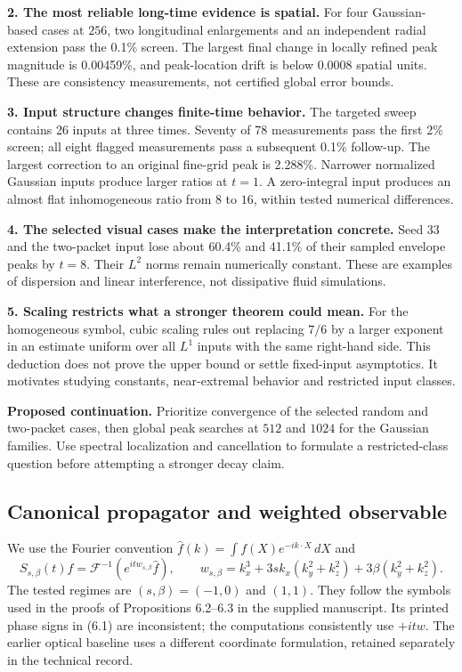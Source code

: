 \documentclass[10pt,letterpaper]{article}
\numberwithin{equation}{section}
\newcommand{\callout}[1]{\par\medskip\noindent #1\par\medskip}
\begin{document}
\textbf{2. The most reliable long-time evidence is spatial.} For four
Gaussian-based cases at $256$, two longitudinal enlargements and an independent
radial extension pass the 0.1\% screen. The largest final change in locally
refined peak magnitude is 0.00459\%, and peak-location drift is below 0.0008
spatial units. These are consistency measurements, not certified global error bounds.

\textbf{3. Input structure changes finite-time behavior.} The targeted sweep
contains 26 inputs at three times. Seventy of 78 measurements pass the first 2\%
screen; all eight flagged measurements pass a subsequent 0.1\% follow-up. The
largest correction to an original fine-grid peak is 2.288\%. Narrower normalized
Gaussian inputs produce larger ratios at $t=1$. A zero-integral input produces an
almost flat inhomogeneous ratio from $8$ to $16$, within tested numerical differences.

\textbf{4. The selected visual cases make the interpretation concrete.} Seed 33
and the two-packet input lose about 60.4\% and 41.1\% of their sampled envelope
peaks by $t=8$. Their $L^2$ norms remain numerically constant. These are examples
of dispersion and linear interference, not dissipative fluid simulations.

\textbf{5. Scaling restricts what a stronger theorem could mean.} For the
homogeneous symbol, cubic scaling rules out replacing $7/6$ by a larger exponent
in an estimate uniform over all $L^1$ inputs with the same right-hand side.
This deduction does not prove the upper bound or settle fixed-input asymptotics.
It motivates studying constants, near-extremal behavior and restricted input classes.
\callout{\textbf{Proposed continuation.} Prioritize convergence of
the selected random and two-packet cases, then global peak searches at $512$ and
$1024$ for the Gaussian families. Use spectral localization and cancellation to
formulate a restricted-class question before attempting a stronger decay claim.}

\subsection{Canonical propagator and weighted observable}\label{target}
We use the Fourier convention $\widehat f(k)=\int f(X)e^{-ik\cdot X}\,dX$ and
\begin{equation}
 S_{s,\beta}(t)f=\mathcal F^{-1}(e^{itw_{s,\beta}}\widehat f),\qquad
 w_{s,\beta}=k_x^3+3s k_x(k_y^2+k_z^2)+3\beta(k_y^2+k_z^2).
\end{equation}
The tested regimes are $(s,\beta)=(-1,0)$ and $(1,1)$. They follow the symbols
used in the proofs of Propositions 6.2--6.3 in the supplied manuscript. Its printed
phase signs in (6.1) are inconsistent; the computations consistently use $+itw$.
The earlier optical baseline uses a different coordinate formulation, retained
separately in the technical record.
\end{document}
